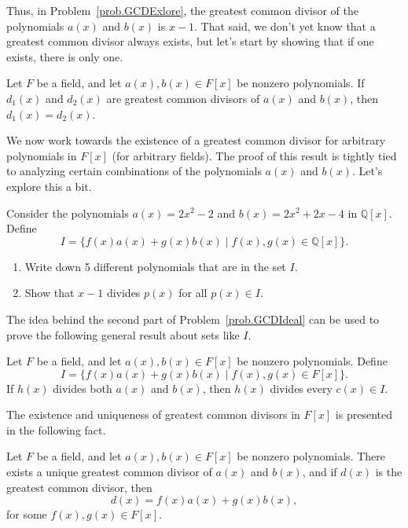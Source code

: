 Thus, in Problem~\ref{prob.GCDExlore},  the greatest common divisor of the polynomials $a(x)$ and $b(x)$ is $x-1$.
That said, we don't yet know that a greatest common divisor always exists, but let's start by showing that if one exists, there is only one.

\begin{lemma}\label{lem.GCDUnique}
Let $F$ be a field, and let $a(x), b(x)\in F[x]$ be nonzero polynomials. If $d_1(x)$ and $d_2(x)$ are  greatest common divisors of $a(x)$ and $b(x)$, then $d_1(x)=d_2(x)$.
\end{lemma}

We now work towards the existence of a greatest common divisor for arbitrary polynomials in $F[x]$ (for arbitrary fields). The proof of this result is tightly tied to analyzing certain combinations of the polynomials $a(x)$ and $b(x)$. Let's explore this a bit.

\begin{problem}\label{prob.GCDIdeal}
Consider the polynomials $a(x) = 2x^2-2$ and $b(x) = 2x^2+2x-4$ in $\mathbb{Q}[x]$.  Define \[I = \{f(x)a(x) + g(x)b(x)\mid f(x),g(x)\in \mathbb{Q}[x]\}.\]
\begin{enumerate}
\item Write down 5 different polynomials that are in the set $I$. 
\item Show that $x-1$ divides $p(x)$ for all  $p(x) \in I$.
\end{enumerate}
\end{problem}

The idea behind the second part of Problem~\ref{prob.GCDIdeal} can be used to prove the following general result about sets like $I$.

\begin{theorem}\label{thm.HalfOfGCDProof}
Let $F$ be a field, and let $a(x), b(x)\in F[x]$ be nonzero polynomials. Define \[I = \{f(x)a(x) + g(x)b(x)\mid f(x),g(x)\in F[x]\}.\]
If $h(x)$ divides both $a(x)$ and $b(x)$, then $h(x)$ divides every $c(x)\in I$.
\end{theorem}

The existence and uniqueness of greatest common divisors in $F[x]$ is presented in the following fact.

\begin{fact}\label{fact.GCD}
Let $F$ be a field, and let $a(x), b(x)\in F[x]$ be nonzero polynomials. There exists a unique greatest common divisor of $a(x)$ and $b(x)$, and if $d(x)$ is the greatest common divisor, then \[d(x) = f(x)a(x) + g(x)b(x),\]
for some $f(x),g(x)\in F[x]$.
\end{fact}

